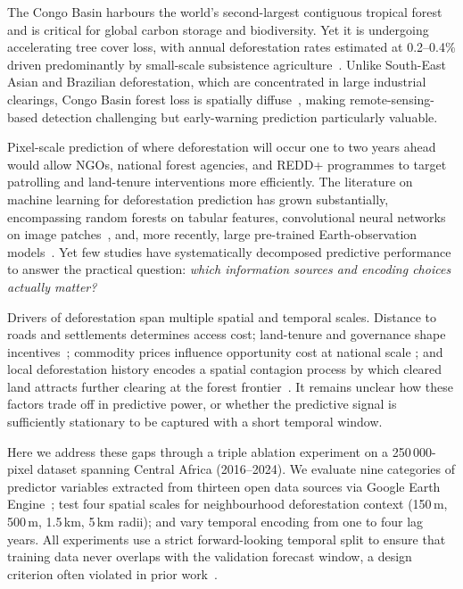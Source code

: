 \documentclass{iopart}
\begin{document}
The Congo Basin harbours the world's second-largest contiguous tropical
forest and is critical for global carbon storage and biodiversity.
Yet it is undergoing accelerating tree cover loss, with annual deforestation
rates estimated at 0.2--0.4\% driven predominantly by small-scale
subsistence agriculture~\cite{Tyukavina2018, Shapiro2023}.
Unlike South-East Asian and Brazilian deforestation, which are concentrated
in large industrial clearings, Congo Basin forest loss is spatially
diffuse~\cite{Ernst2013, Potapov2012}, making remote-sensing-based
detection challenging but early-warning prediction particularly valuable.

Pixel-scale prediction of where deforestation will occur one to two years
ahead would allow NGOs, national forest agencies, and REDD+ programmes to
target patrolling and land-tenure interventions more efficiently.
The literature on machine learning for deforestation prediction
has grown substantially, encompassing random forests on tabular features,
convolutional neural networks on image patches~\cite{Ball2022, Irvin2024},
and, more recently, large pre-trained Earth-observation
models~\cite{Jakubik2024, ForestCast2025}.
Yet few studies have systematically decomposed predictive performance
to answer the practical question: \emph{which information sources
and encoding choices actually matter?}

Drivers of deforestation span multiple spatial and temporal scales.
Distance to roads and settlements determines access cost; land-tenure
and governance shape incentives~\cite{Busch2017, Hosonuma2012};
commodity prices influence opportunity cost at national scale
\cite{Pendrill2019, Ordway2017}; and local deforestation history
encodes a spatial contagion process by which cleared land attracts
further clearing at the forest frontier~\cite{FerrerVelasco2020}.
It remains unclear how these factors trade off in predictive power,
or whether the predictive signal is sufficiently stationary to be
captured with a short temporal window.

Here we address these gaps through a triple ablation experiment on
a 250\,000-pixel dataset spanning Central Africa (2016--2024).
We evaluate nine categories of predictor variables extracted from
thirteen open data sources via Google Earth Engine~\cite{Gorelick2017};
test four spatial scales for neighbourhood deforestation context
(150\,m, 500\,m, 1.5\,km, 5\,km radii); and vary temporal encoding
from one to four lag years.
All experiments use a strict forward-looking temporal split to ensure
that training data never overlaps with the validation forecast window,
a design criterion often violated in prior work~\cite{Roberts2017}.
\end{document}
